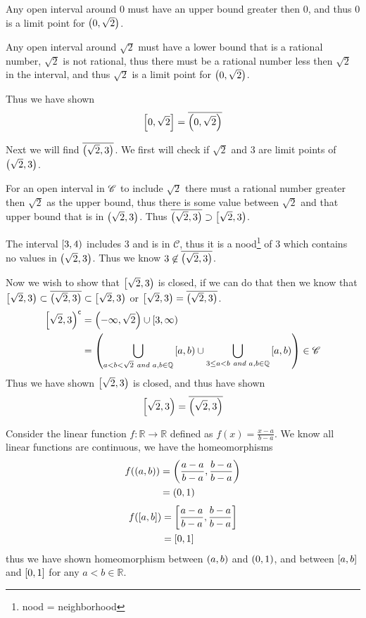 \documentclass{article}
\begin{document}
Any open interval around $0$ must have an upper bound greater then $0$, and thus $0$ is a limit point for $\left( {0} , {\sqrt2} \right)$.

Any open interval around $\sqrt2$ must have a lower bound that is a rational number, $\sqrt2$ is not rational, thus there must be a rational number less then $\sqrt2$ in the interval, and thus $\sqrt2$ is a limit point for $\left( {0} , {\sqrt2} \right)$.

Thus we have shown \[\left[ {0} , {\sqrt2} \right] = \overline{\left( {0} , {\sqrt2} \right)}\]

Next we will find $\overline{\left( {\sqrt2} , {3} \right)}$. We first will check if $\sqrt2$ and $3$ are limit points of $\left( {\sqrt2} , {3} \right)$.

For an open interval in $\mathscr C$ to include $\sqrt2$ there must a rational number greater then $\sqrt2$ as the upper bound, thus there is some value between $\sqrt2$ and that upper bound that is in $\left( {\sqrt2} , {3} \right)$. Thus $\overline{\left( {\sqrt2} , {3} \right)} \supset \left[ {\sqrt2} , {3} \right)$.

The interval $\left[ {3} , {4} \right)$ includes $3$ and is in $\mathscr C$, thus it is a nood\footnote{nood = neighborhood} of $3$ which contains no values in $\left( {\sqrt2} , {3} \right)$. Thus we know $3 \not\in \overline{\left( {\sqrt2} , {3} \right)}$.

Now we wish to show that $\left[ {\sqrt2} , {3} \right)$ is closed, if we can do that then we know that $\left[ {\sqrt2} , {3} \right) \subset \overline{\left( {\sqrt2} , {3} \right)} \subset \left[ {\sqrt2} , {3} \right)$ or $\left[ {\sqrt2} , {3} \right) = \overline{\left( {\sqrt2} , {3} \right)}$.
\begin{align*}
{\left[ {\sqrt2} , {3} \right)}^{\mathsf{c}} &= \left( {-\infty} , {\sqrt2} \right) \cup \left[ {3} , {\infty} \right) \\
&= \left( \bigcup\limits_{a<b<\sqrt2 \textit{ and } a,b\in\mathbb Q}^{}  {\left[ {a} , {b} \right)}  \cup \bigcup\limits_{3 \le a < b \textit{ and } a,b \in \mathbb Q}^{}  {\left[ {a} , {b} \right)}  \right) \in \mathscr C
\end{align*}
Thus we have shown $\left[ {\sqrt2} , {3} \right)$ is closed, and thus have shown
\[\left[ {\sqrt2} , {3} \right) = \overline{\left( {\sqrt2} , {3} \right)}\]


\bigskip
Consider the linear function $f:\mathbb R \to \mathbb R$ defined as $f(x) = \frac{x-a}{b-a}$. We know all linear functions are continuous, we have the homeomorphisms
\begin{align*}
f(\left( {a} , {b} \right)) &= \left( {\frac{a-a}{b-a}} , {\frac{b-a}{b-a}} \right) \\
&= \left( {0} , {1} \right)
\end{align*}
\begin{align*}
f(\left[ {a} , {b} \right]) &= \left[ {\frac{a-a}{b-a}} , {\frac{b-a}{b-a}} \right] \\
&= \left[ {0} , {1} \right]
\end{align*}
thus we have shown homeomorphism between $\left( {a} , {b} \right)$ and $\left( {0} , {1} \right)$, and between $\left[ {a} , {b} \right]$ and $\left[ {0} , {1} \right]$ for any $a<b\in\mathbb R$.
\end{document}
